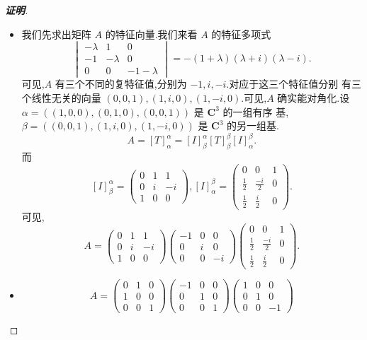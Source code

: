 \documentclass[a4paper]{article}
\begin{document}
\begin{proof}[\textbf{证明}]
\begin{itemize}
\item 我们先求出矩阵 $A$ 的特征向量.我们来看 $A$ 的特征多项式
$$
\begin{vmatrix}
  -\lambda&1&0\\
-1&-\lambda&0\\
0&0&-1-\lambda
\end{vmatrix}=-(1+\lambda)(\lambda+i)(\lambda-i).
$$
可见,$A$ 有三个不同的复特征值,分别为 $-1,i,-i$.对应于这三个特征值分别
有三个线性无关的向量 $(0,0,1),(1,i,0),(1,-i,0)$.可见,$A$ 确实能对角化.设
$\alpha=((1,0,0),(0,1,0),(0,0,1))$ 是 $\mathbf{C}^3$ 的一组有序
基,$\beta=((0,0,1),(1,i,0),(1,-i,0))$ 是 $\mathbf{C}^3$ 的另一组基.
$$
A=[T]_{\alpha}^{\alpha}=[I]_{\beta}^{\alpha}[T]_{\beta}^{\beta}[I]_{\alpha}^{\beta}.
$$
而
$$
[I]_{\beta}^{\alpha}=
\begin{pmatrix}
  0&1&1\\
0&i&-i\\
1&0&0
\end{pmatrix} ,[I]_{\alpha}^{\beta}=
\begin{pmatrix}
  0&0&1\\
\frac{1}{2}&\frac{-i}{2}&0\\
\frac{1}{2}&\frac{i}{2}&0
\end{pmatrix}.
$$
可见,
$$
A=\begin{pmatrix}
  0&1&1\\
0&i&-i\\
1&0&0
\end{pmatrix}
\begin{pmatrix} 
  -1&0&0\\
0&i&0\\
0&0&-i
\end{pmatrix}\begin{pmatrix}
  0&0&1\\
\frac{1}{2}&\frac{-i}{2}&0\\
\frac{1}{2}&\frac{i}{2}&0
\end{pmatrix}.
$$
\item
$$
A=
\begin{pmatrix}
  0&1&0\\
  1&0&0\\
  0&0&1
\end{pmatrix}
\begin{pmatrix}
  -1&0&0\\
0&1&0\\
0&0&1
\end{pmatrix}
\begin{pmatrix}
  1&0&0\\
0&1&0\\
0&0&-1
\end{pmatrix}
$$
\end{itemize}
\end{proof}
\end{document}
